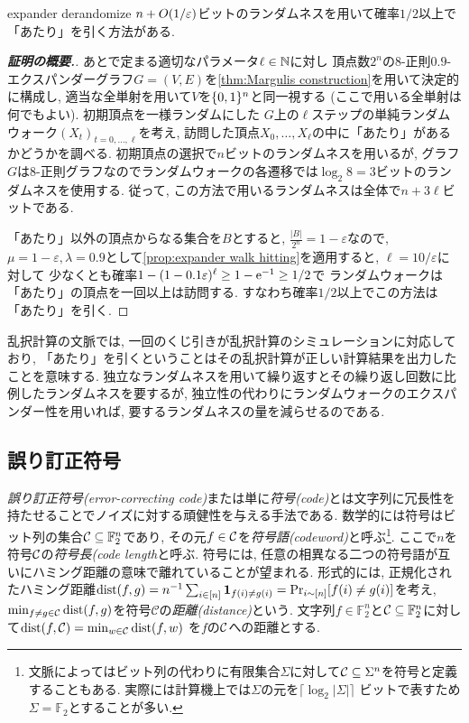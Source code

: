 \begin{proposition}{}{expander derandomize}
    $n + O\rbra*{1/\varepsilon}$ビットのランダムネスを用いて確率$1/2$以上で「あたり」を引く方法がある.
\end{proposition}
\begin{proof}[\textbf{証明の概要.}]
    あとで定まる適切なパラメータ$\ell\in\mathbb{N}$に対し
    頂点数$2^n$の$8$-正則$0.9$-エクスパンダーグラフ$G=(V,E)$を\cref{thm:Margulis construction}を用いて決定的に構成し, 適当な全単射を用いて$V$を$\{0,1\}^n$と同一視する (ここで用いる全単射は何でもよい).
    初期頂点を一様ランダムにした
    $G$上の$\ell$ステップの単純ランダムウォーク$(X_t)_{t=0,\dots,\ell}$を考え,
    訪問した頂点$X_0,\dots,X_\ell$の中に「あたり」があるかどうかを調べる.
    初期頂点の選択で$n$ビットのランダムネスを用いるが,
    グラフ$G$は$8$-正則グラフなのでランダムウォークの各遷移では$\log_2 8=3$ビットのランダムネスを使用する.
    従って, この方法で用いるランダムネスは全体で$n + 3\ell$ビットである.

    「あたり」以外の頂点からなる集合を$B$とすると, $\frac{|B|}{2^n} = 1-\varepsilon$なので,
    $\mu = 1-\varepsilon, \lambda=0.9$として\cref{prop:expander walk hitting}を適用すると,
    $\ell=10/\varepsilon$に対して
    少なくとも確率$1-(1-0.1\varepsilon)^\ell \ge 1-\mathrm{e}^{-1} \ge 1/2$で
    ランダムウォークは「あたり」の頂点を一回以上は訪問する.
    すなわち確率$1/2$以上でこの方法は「あたり」を引く.
\end{proof}

乱択計算の文脈では, 一回のくじ引きが乱択計算のシミュレーションに対応しており,
「あたり」を引くということはその乱択計算が正しい計算結果を出力したことを意味する.
独立なランダムネスを用いて繰り返すとその繰り返し回数に比例したランダムネスを要するが,
独立性の代わりにランダムウォークのエクスパンダー性を用いれば, 要するランダムネスの量を減らせるのである.


\subsection{誤り訂正符号} \label{sec:error correcting code}
\emph{誤り訂正符号(error-correcting code)}または単に\emph{符号(code)}とは文字列に冗長性を持たせることでノイズに対する頑健性を与える手法である.
数学的には符号はビット列の集合$\mathcal{C}\subseteq\mathbb{F}_2^n$であり, その元$f\in\mathcal{C}$を\emph{符号語(codeword)}と呼ぶ\footnote{文脈によってはビット列の代わりに有限集合$\Sigma$に対して$\mathcal{C}\subseteq\Sigma^n$を符号と定義することもある. 実際には計算機上では$\Sigma$の元を$\lceil\log_2 |\Sigma|\rceil$ ビットで表すため$\Sigma=\mathbb{F}_2$とすることが多い.}.
ここで$n$を符号$\mathcal{C}$の\emph{符号長(code length}と呼ぶ.
符号には, 任意の相異なる二つの符号語が互いにハミング距離の意味で離れていることが望まれる.
形式的には, 正規化されたハミング距離$\mathrm{dist}(f,g)=n^{-1}\sum_{i\in[n]}\mathbf{1}_{f(i)\neq g(i)}=\Pr_{i\sim[n]}[f(i)\neq g(i)]$を考え, $\min_{f\neq g\in\mathcal{C}}\mathrm{dist}(f,g)$を符号$\mathcal{C}$の\emph{距離(distance)}という.
文字列$f\in\mathbb{F}_2^n$と$\mathcal{C}\subseteq\mathbb{F}_2^n$に対して$\mathrm{dist}(f,\mathcal{C})=\min_{w\in\mathcal{C}}\mathrm{dist}(f,w)$
を$f$の$\mathcal{C}$への距離とする.


